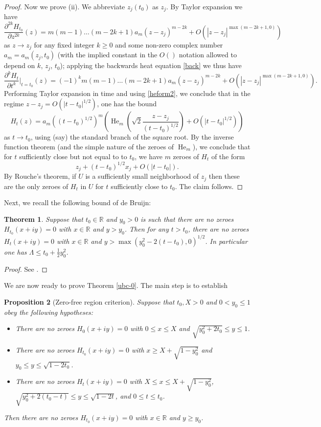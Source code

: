 \documentclass[a4paper,11pt,twoside]{amsart}
\newtheorem{theorem}{Theorem}[section]
\newtheorem{proposition}[theorem]{Proposition}
\newcommand\R{\mathbb{R}}
\begin{document}
\begin{proof}
Now we prove (ii).  We abbreviate $z_j(t_0)$ as $z_j$.  By Taylor expansion we have
$$ \frac{\partial^{2k} H_{t_0}}{\partial z^{2k}}(z) = m (m-1) \dots (m-2k+1) a_m (z-z_j)^{m-2k} + O( |z-z_j|^{\max(m-2k+1,0)} )$$
as $z \to z_j$ for any fixed integer $k \geq 0$ and some non-zero complex number $a_m = a_m(z_j, t_0)$ (with the implied constant in the $O()$ notation allowed to depend on $k$, $z_j$, $t_0$); applying the backwards heat equation \eqref{back} we thus have
$$ \frac{\partial^k H_t}{\partial t^k}|_{t=t_0}(z) = (-1)^k m (m-1) \dots (m-2k+1) a_m (z-z_j)^{m-2k} + O( |z-z_j|^{\max(m-2k+1,0)} ).$$
Performing Taylor expansion in time and using \eqref{heform2}, we conclude that in the regime $z - z_j = O( |t-t_0|^{1/2} )$, one has the bound
$$ H_t(z) = a_m ((t-t_0)^{1/2})^m \left( \operatorname{He}_m\left( \sqrt{2} \frac{z-z_j}{(t-t_0)^{1/2}} \right) + O\left( |t-t_0|^{1/2} \right) \right)$$
as $t \to t_0$, using (say) the standard branch of the square root.  By the inverse function theorem (and the simple nature of the zeroes of $\operatorname{He}_m$), we conclude that for $t$ sufficiently close but not equal to to $t_0$, we have $m$ zeroes of $H_t$ of the form
$$ z_j + (t-t_0)^{1/2} x_j + O( |t-t_0| ).$$
By Rouche's theorem, if $U$ is a sufficiently small neighborhood of $z_j$ then these are the only zeroes of $H_t$ in $U$ for $t$ sufficiently close to $t_0$.  The claim follows.
\end{proof}

Next, we recall the following bound of de Bruijn:

\begin{theorem}\label{debr-bound}  Suppose that $t_0 \in \R$ and $y_0 > 0$ is such that there are no zeroes $H_{t_0}(x+iy)=0$ with $x \in \R$ and $y > y_0$.  Then for any $t>t_0$, there are no zeroes $H_{t}(x+iy)=0$ with $x \in \R$ and $y > \max( y_0^2 - 2(t-t_0), 0)^{1/2}$.  In particular one has $\Lambda \leq t_0 + \frac{1}{2} y_0^2$.
\end{theorem}

\begin{proof} See \cite[Theorem 13]{debr}.
\end{proof}

We are now ready to prove Theorem \ref{ubc-0}.  The main step is to establish

\begin{proposition}[Zero-free region criterion]\label{ubc}  Suppose that $t_0, X > 0$ and $0 < y_0 \leq 1$ obey the following hypotheses:
\begin{itemize}
\item[(i)]  There are no zeroes $H_0(x+iy)=0$ with $0 \leq x \leq X$ and $\sqrt{y_0^2+2 t_0} \leq y \leq 1$.
\item[(ii)]  There are no zeroes $H_{t_0}(x+iy)=0$ with $x \geq X+\sqrt{1-y_0^2}$ and $y_0 \leq y \leq \sqrt{1-2t_0}$.
\item[(iii)]  There are no zeroes $H_{t}(x+iy)=0$ with $X \leq x \leq X+\sqrt{1-y_0^2}$, $\sqrt{y_0^2 + 2(t_0-t)} \leq y \leq \sqrt{1-2t}$, and $0 \leq t \leq t_0$.
\end{itemize}
Then there are no zeroes $H_{t_0}(x+iy) = 0$ with $x \in \R$ and $y \geq y_0$.
\end{proposition}
\end{document}
